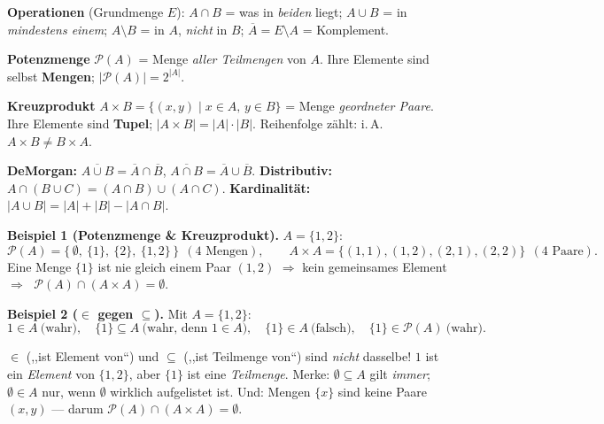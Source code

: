 \documentclass[a4paper,11pt]{article}
\begin{document}
\begin{vorgehen}
\textbf{Operationen} (Grundmenge $E$):\quad
$A\cap B$ = was in \emph{beiden} liegt; \;$A\cup B$ = in \emph{mindestens einem}; \;$A\setminus B$ = in $A$, \emph{nicht} in $B$; \;$\overline{A}=E\setminus A$ = Komplement.
\par\vspace{1.5mm}
\textbf{Potenzmenge} $\mathcal{P}(A)$ = Menge \emph{aller Teilmengen} von $A$. Ihre Elemente sind selbst \textbf{Mengen}; $|\mathcal{P}(A)|=2^{|A|}$.
\par\vspace{1mm}
\textbf{Kreuzprodukt} $A\times B=\{(x,y)\mid x\in A,\,y\in B\}$ = Menge \emph{geordneter Paare}. Ihre Elemente sind \textbf{Tupel}; $|A\times B|=|A|\cdot|B|$. Reihenfolge zählt: i.\,A.\ $A\times B\neq B\times A$.
\par\vspace{1mm}
\textbf{DeMorgan:} $\overline{A\cup B}=\overline{A}\cap\overline{B}$,\; $\overline{A\cap B}=\overline{A}\cup\overline{B}$.\qquad
\textbf{Distributiv:} $A\cap(B\cup C)=(A\cap B)\cup(A\cap C)$.\qquad
\textbf{Kardinalität:} $|A\cup B|=|A|+|B|-|A\cap B|$.
\par\vspace{2mm}
\textbf{Beispiel 1 (Potenzmenge \& Kreuzprodukt).} $A=\{1,2\}$:
\[
\mathcal{P}(A)=\{\,\emptyset,\ \{1\},\ \{2\},\ \{1,2\}\,\}\ \ (4\text{ Mengen}),\qquad
A\times A=\{(1,1),(1,2),(2,1),(2,2)\}\ \ (4\text{ Paare}).
\]
Eine Menge $\{1\}$ ist nie gleich einem Paar $(1,2)$ $\Rightarrow$ kein gemeinsames Element $\Rightarrow$ $\;\mathcal{P}(A)\cap(A\times A)=\emptyset$.
\par\vspace{2mm}
\textbf{Beispiel 2 ($\in$ gegen $\subseteq$).} Mit $A=\{1,2\}$:
\[
1\in A\ \text{(wahr)},\quad \{1\}\subseteq A\ \text{(wahr, denn $1\in A$)},\quad \{1\}\in A\ \text{(falsch)},\quad \{1\}\in\mathcal{P}(A)\ \text{(wahr)}.
\]
\end{vorgehen}

\begin{merke}
$\in$ (,,ist Element von``) und $\subseteq$ (,,ist Teilmenge von``) sind \emph{nicht} dasselbe! $1$ ist ein \emph{Element} von $\{1,2\}$, aber $\{1\}$ ist eine \emph{Teilmenge}. Merke: $\emptyset\subseteq A$ gilt \emph{immer}; $\emptyset\in A$ nur, wenn $\emptyset$ wirklich aufgelistet ist. Und: Mengen $\{x\}$ sind keine Paare $(x,y)$ --- darum $\mathcal{P}(A)\cap(A\times A)=\emptyset$.
\end{merke}
\end{document}
